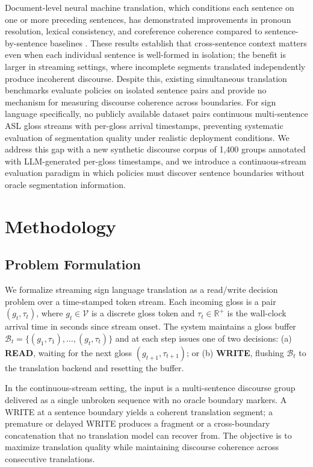 \documentclass[conference]{IEEEtran}
\begin{document}
Document-level neural machine translation, which conditions each sentence on one or more preceding sentences, has demonstrated improvements in pronoun resolution, lexical consistency, and coreference coherence compared to sentence-by-sentence baselines \cite{voita2018context,maruf2019selective}. These results establish that cross-sentence context matters even when each individual sentence is well-formed in isolation; the benefit is larger in streaming settings, where incomplete segments translated independently produce incoherent discourse. Despite this, existing simultaneous translation benchmarks evaluate policies on isolated sentence pairs and provide no mechanism for measuring discourse coherence across boundaries. For sign language specifically, no publicly available dataset pairs continuous multi-sentence ASL gloss streams with per-gloss arrival timestamps, preventing systematic evaluation of segmentation quality under realistic deployment conditions. We address this gap with a new synthetic discourse corpus of 1,400 groups annotated with LLM-generated per-gloss timestamps, and we introduce a continuous-stream evaluation paradigm in which policies must discover sentence boundaries without oracle segmentation information.

\section{Methodology}

\subsection{Problem Formulation}

We formalize streaming sign language translation as a read/write decision problem over a time-stamped token stream. Each incoming gloss is a pair $(g_t, \tau_t)$, where $g_t \in \mathcal{V}$ is a discrete gloss token and $\tau_t \in \mathbb{R}^{+}$ is the wall-clock arrival time in seconds since stream onset. The system maintains a gloss buffer $\mathcal{B}_t = \{(g_1, \tau_1), \ldots, (g_t, \tau_t)\}$ and at each step issues one of two decisions: (a) \textbf{READ}, waiting for the next gloss $(g_{t+1}, \tau_{t+1})$; or (b) \textbf{WRITE}, flushing $\mathcal{B}_t$ to the translation backend and resetting the buffer.

In the continuous-stream setting, the input is a multi-sentence discourse group delivered as a single unbroken sequence with no oracle boundary markers. A WRITE at a sentence boundary yields a coherent translation segment; a premature or delayed WRITE produces a fragment or a cross-boundary concatenation that no translation model can recover from. The objective is to maximize translation quality while maintaining discourse coherence across consecutive translations.
\end{document}
